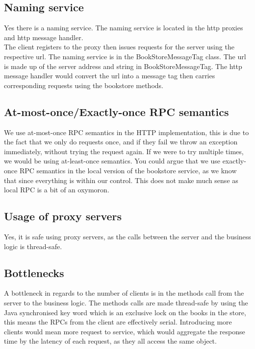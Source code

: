 \documentclass[a4paper]{article}
\begin{document}
\subsection{Naming service}
Yes there is a naming service. The naming service is located in the http proxies and http message handler.\\ 
The client registers to the proxy then issues requests for the server using the respective url. The naming service is in the BookStoreMessageTag class. The url is made up of the server address and string in BookStoreMessageTag. The http message handler would convert the url into a message tag then carries corresponding requests using the bookstore methods.

\subsection{At-most-once/Exactly-once RPC semantics}
We use at-most-once RPC semantics in the HTTP implementation, this is due to the fact that we only do requests once, and if they fail we throw an exception immediately, without trying the request again. If we were to try multiple times, we would be using at-least-once semantics. You could argue that we use exactly-once RPC semantics in the local version of the bookstore service, as we know that since everything is within our control. This does not make much sense as local RPC is a bit of an oxymoron.
\subsection{Usage of proxy servers}
Yes, it is safe using proxy servers, as the calls between the server and the business logic is thread-safe.
\subsection{Bottlenecks}
A bottleneck in regards to the number of clients is in the methods call from the server to the business logic. The methods calls are made thread-safe by using the Java synchronised key word which is an exclusive lock on the books in the store, this means the RPCs from the client are effectively serial. Introducing more clients would mean more request to service, which would aggregate the response time by the latency of each request, as they all access the same object. 
\end{document}
